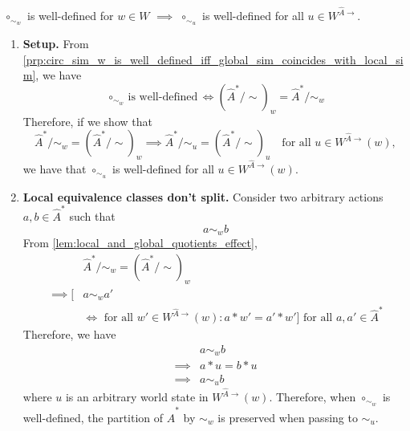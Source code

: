 \begin{propositionE}
    $\circ_{\sim_{w}}$ is well-defined for $w \in W$ $\implies$ $\circ_{\sim_{u}}$ is well-defined for all $u \in W^{\hat{A}\to}$.
\end{propositionE}
\begin{proofE}
\begin{enumerate}
    \item \textbf{Setup.}
    From \cref{prp:circ_sim_w_is_well_defined_iff_global_sim_coincides_with_local_sim}, we have
    \begin{equation}
        \text{$\circ_{\sim_{w}}$ is well-defined} \iff (\hat{A}^{*}/\sim)_{w} = \hat{A}^{*}/\sim_{w}
    \end{equation}
    Therefore, if we show that
    \begin{equation}
        \hat{A}^{*}/\sim_{w} = (\hat{A}^{*}/\sim)_{w} \implies \hat{A}^{*}/\sim_{u} = (\hat{A}^{*}/\sim)_{u} \quad \text{for all $u \in W^{\hat{A}\to}(w)$},
    \end{equation}
    we have that $\circ_{\sim_{u}}$ is well-defined for all $u \in W^{\hat{A}\to}(w)$.

    \item \textbf{Local equivalence classes don't split.}
    Consider two arbitrary actions $a,b \in \hat{A}^{*}$ such that
    \begin{equation}
        a \sim_{w} b
    \end{equation}
    From \cref{lem:local_and_global_quotients_effect},
    \begin{equation}
    \begin{aligned}
        & \hat{A}^{*}/\sim_{w} = (\hat{A}^{*}/\sim)_{w} \\
        \implies [ & a \sim_{w} a' 
        \\ & \iff \text{ for all $w' \in W^{\hat{A}\to}(w)$}: a \ast w' = a' \ast w'] \text{ for all $a,a' \in \hat{A}^{*}$}
    \end{aligned}
    \end{equation}
    Therefore, we have
    \begin{align}
        & a \sim_{w} b \\
        \implies & a \ast u = b \ast u \\
        \implies & a \sim_{u} b
    \end{align}
    where $u$ is an arbitrary world state in $W^{\hat{A}\to}(w)$.
    Therefore, when $\circ_{\sim_{w}}$ is well-defined, the partition of $\hat{A}^{*}$ by $\sim_{w}$ is preserved when passing to $\sim_{u}$.


\end{enumerate}
\end{proofE}
